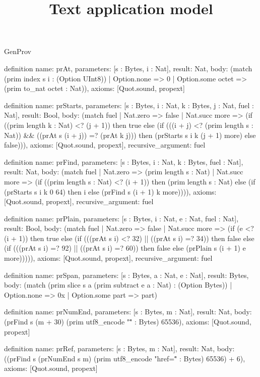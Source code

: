 \begin{lexlean}{GenProv}
\title{Text application model}
\begin{semanticmodule}
definition{
  name: prAt,
  parameters: [s : Bytes, i : Nat],
  result: Nat,
  body: (match (prim index s i : (Option UInt8))
    | Option.none => 0
    | Option.some octet => (prim to_nat octet : Nat)),
  axioms: [Quot.sound, propext]
}

definition{
  name: prStarts,
  parameters: [s : Bytes, i : Nat, k : Bytes, j : Nat, fuel : Nat],
  result: Bool,
  body: (match fuel
    | Nat.zero => false
    | Nat.succ more => (if ((prim length k : Nat) <? (j + 1)) then true else (if (((i + j) <? (prim length s : Nat)) && ((prAt s (i + j)) =? (prAt k j))) then (prStarts s i k (j + 1) more) else false))),
  axioms: [Quot.sound, propext],
  recursive_argument: fuel
}

definition{
  name: prFind,
  parameters: [s : Bytes, i : Nat, k : Bytes, fuel : Nat],
  result: Nat,
  body: (match fuel
    | Nat.zero => (prim length s : Nat)
    | Nat.succ more => (if ((prim length s : Nat) <? (i + 1)) then (prim length s : Nat) else (if (prStarts s i k 0 64) then i else (prFind s (i + 1) k more)))),
  axioms: [Quot.sound, propext],
  recursive_argument: fuel
}

definition{
  name: prPlain,
  parameters: [s : Bytes, i : Nat, e : Nat, fuel : Nat],
  result: Bool,
  body: (match fuel
    | Nat.zero => false
    | Nat.succ more => (if (e <? (i + 1)) then true else (if (((prAt s i) <? 32) || ((prAt s i) =? 34)) then false else (if (((prAt s i) =? 92) || ((prAt s i) =? 60)) then false else (prPlain s (i + 1) e more))))),
  axioms: [Quot.sound, propext],
  recursive_argument: fuel
}

definition{
  name: prSpan,
  parameters: [s : Bytes, a : Nat, e : Nat],
  result: Bytes,
  body: (match (prim slice s a (prim subtract e a : Nat) : (Option Bytes))
    | Option.none => 0x
    | Option.some part => part)
}

definition{
  name: prNumEnd,
  parameters: [s : Bytes, m : Nat],
  result: Nat,
  body: (prFind s (m + 30) (prim utf8_encode "\"" : Bytes) 65536),
  axioms: [Quot.sound, propext]
}

definition{
  name: prRef,
  parameters: [s : Bytes, m : Nat],
  result: Nat,
  body: ((prFind s (prNumEnd s m) (prim utf8_encode "href=\"" : Bytes) 65536) + 6),
  axioms: [Quot.sound, propext]
}


\end{semanticmodule}
\end{lexlean}

